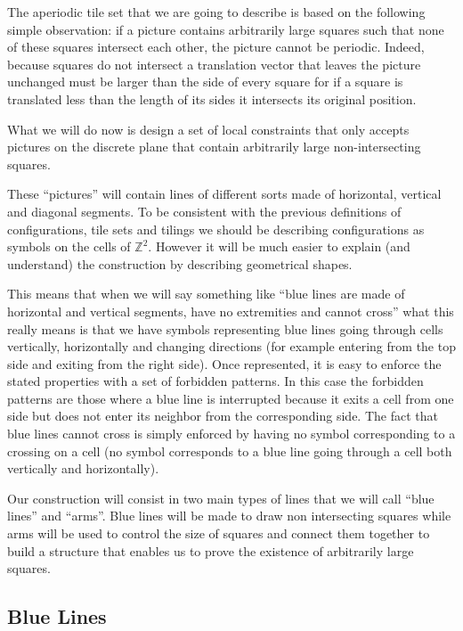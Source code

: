 \documentclass{jac}
\newcommand{\ZZ}{\mathbb{Z}}
\begin{document}
The aperiodic tile set that we are going to describe is based on the following simple observation: if a picture contains arbitrarily large squares such that none of these squares intersect each other, the picture cannot be periodic. Indeed, because squares do not intersect a translation vector that leaves the picture unchanged must be larger than the side of every square for if a square is translated less than the length of its sides it intersects its original position.

What we will do now is design a set of local constraints that only accepts pictures on the discrete plane that contain arbitrarily large non-intersecting squares.

These ``pictures'' will contain lines of different sorts made of horizontal, vertical and diagonal segments. To be consistent with the previous definitions of configurations, tile sets and tilings we should be describing configurations as symbols on the cells of $\ZZ^2$. However it will be much easier to explain (and understand) the construction by describing geometrical shapes.

This means that when we will say something like ``blue lines are made of horizontal and vertical segments, have no extremities and cannot cross'' what this really means is that we have symbols representing blue lines going through cells vertically, horizontally and changing directions (for example entering from the top side and exiting from the right side). Once represented, it is easy to enforce the stated properties with a set of forbidden patterns. In this case the forbidden patterns are those where a blue line is interrupted because it exits a cell from one side but does not enter its neighbor from the corresponding side. The fact that blue lines cannot cross is simply enforced by having no symbol corresponding to a crossing on a cell (no symbol corresponds to a blue line going through a cell both vertically and horizontally).

Our construction will consist in two main types of lines that we will call ``blue lines'' and ``arms''. Blue lines will be made to draw non intersecting squares while arms will be used to control the size of squares and connect them together to build a structure that enables us to prove the existence of arbitrarily large squares.



\subsection{Blue Lines} \label{sub:blue_lines}
\end{document}
